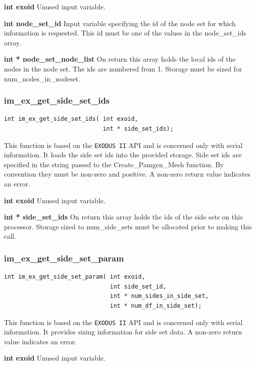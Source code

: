 {\setlength{\parindent}{0pt}
 \textbf{int exoid} Unused input variable.}

{\setlength{\parindent}{0pt}
 \textbf{int node\_set\_id}  Input variable specifying the id of the node set for which information is requested. This id must be one of the values in the node\_set\_ids array.}

{\setlength{\parindent}{0pt}
 \textbf{int * node\_set\_node\_list}  On return this array holds the local ids of the nodes in the node set. The ids are numbered from 1. Storage must be sized for num\_nodes\_in\_nodeset.}


\subsubsection{im\_ex\_get\_side\_set\_ids}
{\ttfamily  \begin{verbatim}
int im_ex_get_side_set_ids( int exoid,
                            int * side_set_ids);
\end{verbatim}}
This function is based on the \texttt{EXODUS II} API and is concerned only with serial information. It loads the side set ids into the provided storage. Side set ids are specified in the string passed to the Create\_Pamgen\_Mesh function. By convention they must be non-zero and positive. A non-zero return value indicates an error.

{\setlength{\parindent}{0pt}
 \textbf{int exoid} Unused input variable.}

{\setlength{\parindent}{0pt}
 \textbf{int * side\_set\_ids}  On return this array holds the ids of the side sets on this processor.  Storage sized to num\_side\_sets must be allocated prior to making this call.}


\subsubsection{im\_ex\_get\_side\_set\_param}
{\ttfamily  \begin{verbatim}
int im_ex_get_side_set_param( int exoid,
                              int side_set_id,
                              int * num_sides_in_side_set,
                              int * num_df_in_side_set);
\end{verbatim}}
This function is based on the \texttt{EXODUS II} API and is concerned only with serial information. It provides sizing information for side set data. A non-zero return value indicates an error.

{\setlength{\parindent}{0pt}
 \textbf{int exoid} Unused input variable.}

